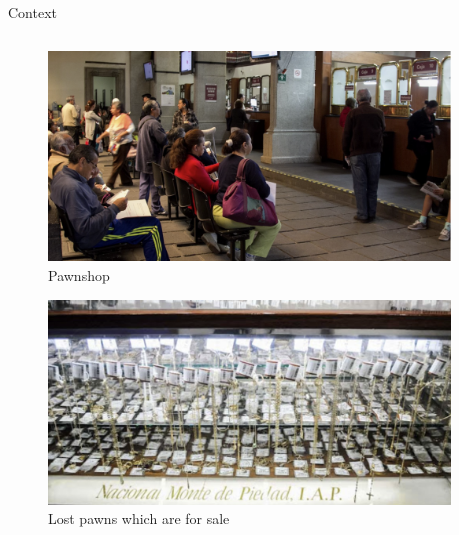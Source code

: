 \documentclass[8pt]{beamer}
\begin{document}
\begin{frame}{Context}
\begin{columns}
\begin{column}{.45\textwidth}
\begin{figure}[H]
    \begin{center}
    \caption{Pawnshop}
        \includegraphics[width=0.95\textwidth]{Figuras/empenio11.png}
    \end{center}
    \end{figure}
\begin{figure}[H]
    \begin{center}
    \caption{Lost pawns which are for sale}
        \includegraphics[width=0.95\textwidth]{Figuras/empenio3.png}
    \end{center}
    \end{figure}    
    
    \end{column}    
    \end{columns}
\end{frame}
\end{document}
